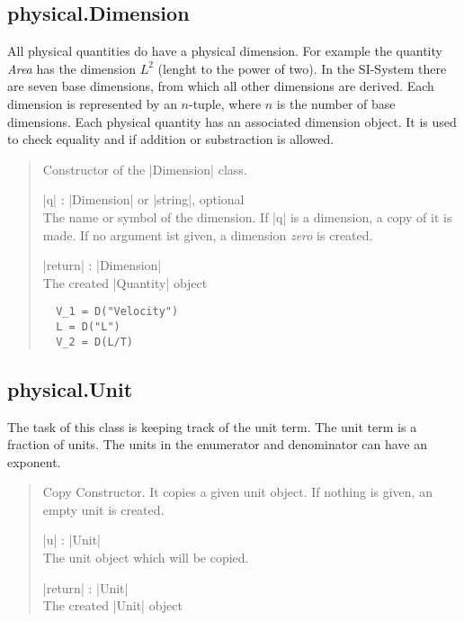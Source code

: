 \documentclass{ltxdoc}
\renewcommand{\emph}[1]{\textit{#1}}
\begin{document}
\subsection{physical.Dimension}

 All physical quantities do have a physical dimension. For example the quantity \emph{Area} has the dimension $L^2$ (lenght to the power of two). In the SI-System there are seven base dimensions, from which all other dimensions are derived. Each dimension is represented by an $n$-tuple, where $n$ is the number of base dimensions. Each physical quantity has an associated dimension object. It is used to check equality and if addition or substraction is allowed.


\begin{quote}
  Constructor of the |Dimension| class.

  \begin{description}
  \item |q| : |Dimension| or |string|, optional\\
    The name or symbol of the dimension. If |q| is a dimension, a copy of it is made. If no argument ist given, a dimension \emph{zero} is created.

  \item |return| : |Dimension|\\
    The created |Quantity| object
  \end{description}


  \subtitle{Example}
  \begin{lstlisting}
  V_1 = D("Velocity")
  L = D("L")
  V_2 = D(L/T)
  \end{lstlisting}
\end{quote}









\subsection{physical.Unit}

The task of this class is keeping track of the unit term. The unit term is a fraction of units. The units in the enumerator and denominator can have an exponent. 


\begin{quote}
  Copy Constructor. It copies a given unit object. If nothing is given, an empty unit is created.

  \begin{description}
  \item |u| : |Unit|\\
    The unit object which will be copied.

  \item |return| : |Unit|\\
    The created |Unit| object
  \end{description}

\end{quote}
\end{document}
